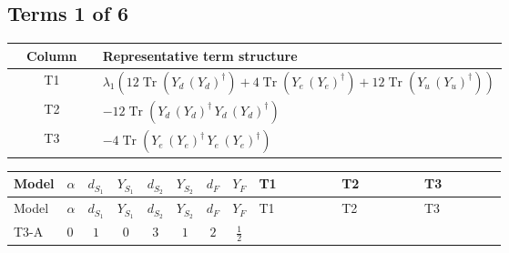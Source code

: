 \documentclass[8pt]{article}
\begin{document}
\begin{landscape}
\subsection*{Terms 1 of 6}
\begin{center}
\begin{tabular}{@{}c >{\raggedright\arraybackslash}p{0.82\linewidth}@{}}
\toprule
Column & Representative term structure \\
\midrule
T1 & \(\displaystyle {\lambda_1} (12 \operatorname{Tr}\!\left({Y_d}\,\left({Y_d}\right)^{\dagger}\right)+4 \operatorname{Tr}\!\left({Y_e}\,\left({Y_e}\right)^{\dagger}\right)+12 \operatorname{Tr}\!\left({Y_u}\,\left({Y_u}\right)^{\dagger}\right))\) \\
\midrule
T2 & \(\displaystyle -12 \operatorname{Tr}\!\left({Y_d}\,\left({Y_d}\right)^{\dagger}\,{Y_d}\,\left({Y_d}\right)^{\dagger}\right)\) \\
\midrule
T3 & \(\displaystyle -4 \operatorname{Tr}\!\left({Y_e}\,\left({Y_e}\right)^{\dagger}\,{Y_e}\,\left({Y_e}\right)^{\dagger}\right)\) \\
\midrule
\bottomrule
\end{tabular}
\end{center}
\smallskip
\tiny
\begin{longtable}{@{}llcccccc >{\raggedright\arraybackslash}p{0.21\linewidth} >{\raggedright\arraybackslash}p{0.21\linewidth} >{\raggedright\arraybackslash}p{0.21\linewidth}@{}}
\toprule
Model & $\alpha$ & $d_{S_1}$ & $Y_{S_1}$ & $d_{S_2}$ & $Y_{S_2}$ & $d_F$ & $Y_F$ & T1 & T2 & T3 \\
\midrule
\endfirsthead
\toprule
Model & $\alpha$ & $d_{S_1}$ & $Y_{S_1}$ & $d_{S_2}$ & $Y_{S_2}$ & $d_F$ & $Y_F$ & T1 & T2 & T3 \\
\midrule
\endhead
T3-A & $0$ & $1$ & $0$ & $3$ & $1$ & $2$ & $\frac{1}{2}$ & \scriptsize\adjustbox{max width=\linewidth}{$\begin{gathered} {\lambda_1} (12 \operatorname{Tr}\!\left({Y_d}\,\left({Y_d}\right)^{\dagger}\right)+4 \operatorname{Tr}\!\left({Y_e}\,\left({Y_e}\right)^{\dagger}\right)+12 \operatorname{Tr}\!\left({Y_u}\,\left({Y_u}\right)^{\dagger}\right))\end{gathered}$} & \scriptsize\adjustbox{max width=\linewidth}{$\begin{gathered} -12 \operatorname{Tr}\!\left({Y_d}\,\left({Y_d}\right)^{\dagger}\,{Y_d}\,\left({Y_d}\right)^{\dagger}\right)\end{gathered}$} & \scriptsize\adjustbox{max width=\linewidth}{$\begin{gathered} -4 \operatorname{Tr}\!\left({Y_e}\,\left({Y_e}\right)^{\dagger}\,{Y_e}\,\left({Y_e}\right)^{\dagger}\right)\end{gathered}$} \\

\end{longtable}
\end{landscape}
\end{document}
